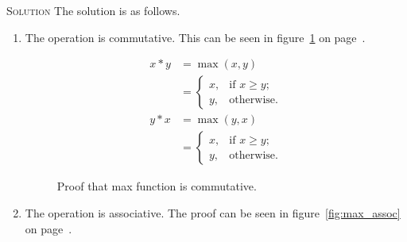 \documentclass{amsart}
\newcommand{\Solution}{\textsc{Solution}\xspace}
\begin{document}
\begin{enumerate}
   \noindent \Solution The solution is as follows.

   \begin{enumerate}
      
      \item The operation is commutative. This can be seen in 
      figure~\ref{fig:max_com} on page~\pageref{fig:max_com}.

      \begin{figure}
      \caption{Proof that max function is commutative.}
      \label{fig:max_com}
      \begin{align*}
         x * y & = \max(x,y)    \\
	       & =
	       \begin{cases}
	          x,       & \text{if $x \ge y$;} \\
		  y,       & \text{otherwise.}
	       \end{cases} \\
	 y * x & = \max(y,x)   \\
	       & =
	       \begin{cases}
	          x,       & \text{if $x \ge y$;} \\
		  y,       & \text{otherwise.}
	       \end{cases}
      \end{align*}
      \end{figure}

      \item The operation is associative. The proof can be seen in
      figure~\ref{fig:max_assoc} on page~\pageref{fig:max_assoc}.


\end{enumerate}
\end{enumerate}
\end{document}
